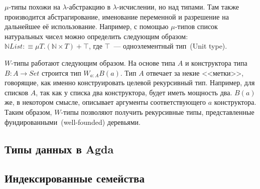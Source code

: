 $\mu$-типы похожи на $\lambda$-абстракцию в $\lambda$-исчислении, но
над типами. Там также производится абстрагирование, именование
переменной и разрешение на дальнейшее её использование. Например, с
помощью $\mu$-типов список натуральных чисел можно определить
следующим образом: $\mathbb{N}List :\equiv \mu T. (\mathbb{N} \times
T) + \top$, где $\top$~--- одноэлементный тип~(Unit type).

$W$-типы работают следующим образом. На основе типа $A$ и конструктора
типа $B : A \to Set$ строится тип $W_{a : A} B(a)$. Тип $A$ отвечает
за некие <<метки>>, говорящие, как именно конструировать целевой
рекурсивный тип. Например, для списков $A$, так как у списка два
конструктора, будет иметь мощность два. $B(a)$ же, в некотором смысле,
описывает аргументы соответствующего $a$ конструктора. Таким образом,
$W$-типы позволяют получить рекурсивные типы, представленные
фундированными~(well-founded) деревьями.

\subsection{Типы данных в Agda}



\subsection{Индексированные семейства}



